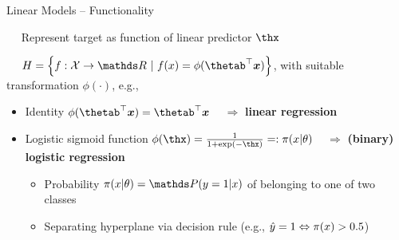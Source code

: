 \begin{vbframe}{Linear Models -- Functionality}

   
\medskip

 ~~ Represent target as function of linear predictor
$\thx$

\medskip

 ~~
$\Hspace = \left\{f: \Xspace \to \R ~|~\fx = \phi(\thetab^\top \xv)\right\}$, 
with suitable transformation $\phi(\cdot)$, e.g.,

\begin{itemize}
  \item Identity $\phi(\thetab^\top \xv) = \thetab^\top \xv$ 
  ~ $\Rightarrow$ \textbf{linear regression}
  \item Logistic sigmoid function $\phi(\thx) = \frac{1}{1 + \exp(- \thx)} 
  =: \pixt$
  ~ $\Rightarrow$ \textbf{(binary) logistic regression}
  \begin{itemize}
    
    \item Probability $\pixt = \post$ of belonging to one of two classes
    \item Separating hyperplane via decision rule 
    (e.g., $\hat{y} = 1 \Leftrightarrow \pi(x) > 0.5$)
  \end{itemize}
\end{itemize}


\end{vbframe}
